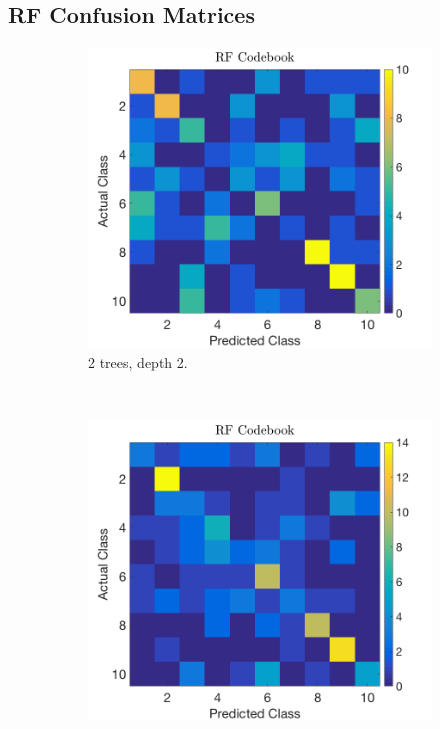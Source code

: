 \documentclass[a4paper, 10pt, conference]{ieeeconf}
\begin{document}
\subsection*{RF Confusion Matrices}
\begin{figure}[!ht]
  \captionsetup[subfigure]{position=b}
  \centering
    \begin{subfigure}{0.45\linewidth}
      \includegraphics[width=\textwidth]{img/rfrf22}
      \caption{2 trees, depth 2.}
      \label{fig:rfrf1}
    \end{subfigure}
    ~
    \begin{subfigure}{0.45\linewidth}
      \includegraphics[width=\textwidth]{img/rfrf26}

\end{subfigure}
\end{figure}
\end{document}
